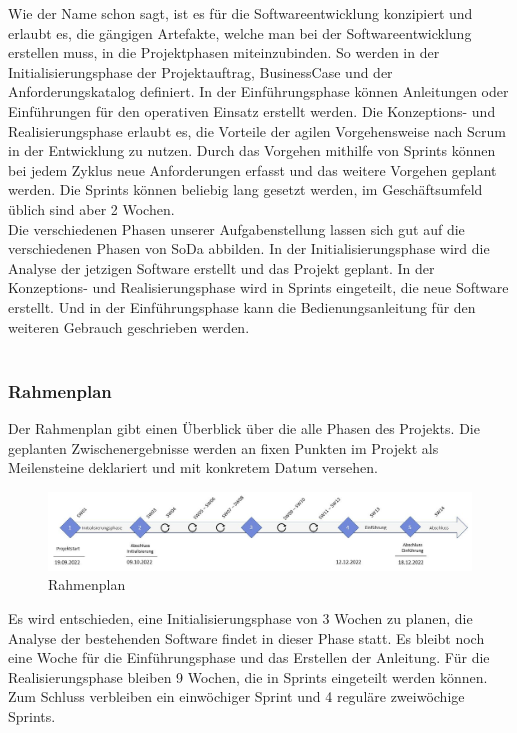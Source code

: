 \documentclass[a4paper, table]{article}
\begin{document}
Wie der Name schon sagt, ist es für die Softwareentwicklung konzipiert und erlaubt es, die gängigen Artefakte, welche man bei der Softwareentwicklung erstellen muss, in die Projektphasen miteinzubinden. 
So werden in der Initialisierungsphase der Projektauftrag, BusinessCase und der Anforderungskatalog definiert. 
In der Einführungsphase können Anleitungen oder Einführungen für den operativen Einsatz erstellt werden.
Die Konzeptions- und Realisierungsphase erlaubt es, die Vorteile der agilen Vorgehensweise nach Scrum in der Entwicklung zu nutzen. 
Durch das Vorgehen mithilfe von Sprints können bei jedem Zyklus neue Anforderungen erfasst und das weitere Vorgehen geplant werden. 
Die Sprints können beliebig lang gesetzt werden, im Geschäftsumfeld üblich sind aber 2 Wochen.\\
Die verschiedenen Phasen unserer Aufgabenstellung lassen sich gut auf die verschiedenen Phasen von \gls{SoDa} abbilden.
In der Initialisierungsphase wird die Analyse der jetzigen Software erstellt und das Projekt geplant.
In der Konzeptions- und Realisierungsphase wird in Sprints eingeteilt, die neue Software erstellt.
Und in der Einführungsphase kann die Bedienungsanleitung für den weiteren Gebrauch geschrieben werden.\\\\

\subsubsection{Rahmenplan}
Der Rahmenplan gibt einen Überblick über die alle Phasen des Projekts. 
Die geplanten Zwischenergebnisse werden an fixen Punkten im Projekt als Meilensteine deklariert und mit konkretem Datum versehen.

\begin{figure}[h]
    \centering
    \hspace*{-2cm}
    \includegraphics[width=1.3\textwidth]{img/Rahmenplan.jpg}
    \caption{Rahmenplan}
    \label{fig:Rahmenplan}
\end{figure}

Es wird entschieden, eine Initialisierungsphase von 3 Wochen zu planen, die Analyse der bestehenden Software findet in dieser Phase statt. 
Es bleibt noch eine Woche für die Einführungsphase und das Erstellen der Anleitung. 
Für die Realisierungsphase bleiben 9 Wochen, die in Sprints eingeteilt werden können. 
Zum Schluss verbleiben ein einwöchiger Sprint und 4 reguläre zweiwöchige Sprints.
\end{document}
